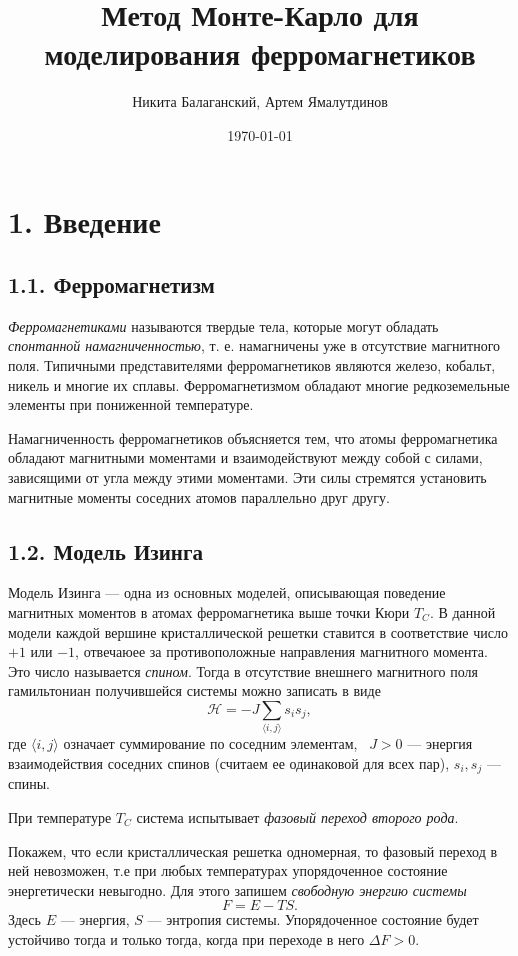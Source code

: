 \documentclass[12pt]{report}
\title{Метод Монте-Карло для моделирования ферромагнетиков}
\author{Никита Балаганский, Артем Ямалутдинов}
\date{\today}
\theoremstyle{definition}
\begin{document}
\maketitle
{}
%
\thispagestyle{fancy}
\newpage
\chapter{1. Введение}
\section{1.1. Ферромагнетизм}
\emph{Ферромагнетиками} называются твердые тела, которые могут обладать \emph{спонтанной намагниченностью}, т. е. намагничены уже в отсутствие магнитного поля.
Типичными представителями ферромагнетиков являются железо, кобальт, никель и многие их сплавы. Ферромагнетизмом обладают многие редкоземельные элементы при пониженной температуре.

Намагниченность ферромагнетиков объясняется тем, что атомы ферромагнетика обладают магнитными моментами и взаимодействуют между собой с силами, зависящими от угла между этими моментами.
Эти силы стремятся установить магнитные моменты соседних атомов параллельно друг другу.

\section{1.2. Модель Изинга}
Модель Изинга --- одна из основных моделей, описывающая поведение магнитных моментов 
в атомах ферромагнетика выше точки Кюри $T_C$. В данной модели каждой вершине кристаллической решетки ставится в соответствие число $+1$ или $-1$, 
отвечаюее за противоположные направления магнитного момента. Это число называется \emph{спином}. Тогда в отсутствие внешнего магнитного поля гамильтониан получившейся системы можно записать в виде
\begin{equation}
    \mathcal{H} = -J\sum_{\langle i, j \rangle}s_is_j,
\end{equation}
где $\langle i, j \rangle$ означает суммирование по соседним элементам,  $J > 0$ --- энергия взаимодействия соседних спинов (считаем ее одинаковой для всех пар),
$s_i, s_j$ --- спины.

При температуре $T_C$ система испытывает \emph{фазовый переход второго рода}.

Покажем, что если кристаллическая решетка одномерная, то фазовый переход в ней невозможен, т.е при любых температурах
упорядоченное состояние энергетически невыгодно.
Для этого запишем \emph{свободную энергию системы}
\begin{equation}
    F = E - TS.
\end{equation}
Здесь  $E$ --- энергия, $S$ --- энтропия системы. Упорядоченное состояние будет устойчиво тогда и только тогда, когда
при переходе в него $\Delta F > 0$.
\end{document}
